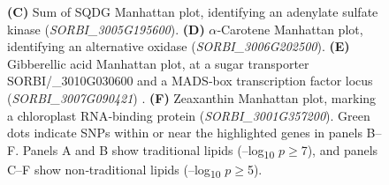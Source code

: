 \documentclass[10pt,letterpaper]{article}
\begin{document}
\begin{figure}[htbp]
{    \textbf{(C)} Sum of SQDG Manhattan plot, identifying an adenylate sulfate kinase (\textit{SORBI\_3005G195600}).  
    \textbf{(D)} \(\alpha\)‐Carotene Manhattan plot, identifying an alternative oxidase (\textit{SORBI\_3006G202500}).  
    \textbf{(E)} Gibberellic acid Manhattan plot, at a sugar transporter SORBI/_3010G030600 and a MADS‐box transcription factor locus (\textit{SORBI\_3007G090421}) .  
    \textbf{(F)} Zeaxanthin Manhattan plot, marking a chloroplast RNA‐binding protein (\textit{SORBI\_3001G357200}).  
    Green dots indicate SNPs within or near the highlighted genes in panels B–F. Panels A and B show traditional lipids (–log\textsubscript{10} $p$\(\geq\)7), and panels C–F show non‐traditional lipids (–log\textsubscript{10} $p$\(\geq\)5).}
  \label{fig:Fig3}
\end{figure}


\end{document}
